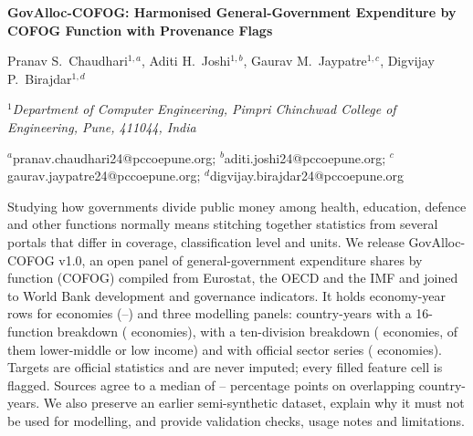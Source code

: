 \documentclass[11pt,a4paper]{article}
\DeclareRobustCommand*{\_}{\textunderscore\hskip0pt\relax}
\begin{document}
\begin{center}
{\LARGE\bfseries GovAlloc-COFOG: Harmonised General-Government Expenditure by COFOG Function with Provenance Flags\par}
\vspace{1.2em}
{\large Pranav S.\ Chaudhari$^{1,a}$, Aditi H.\ Joshi$^{1,b}$, Gaurav M.\ Jaypatre$^{1,c}$, Digvijay P.\ Birajdar$^{1,d}$\par}
\vspace{0.8em}
{\small\itshape $^{1}$Department of Computer Engineering, Pimpri Chinchwad College of Engineering, Pune, 411044, India\par}
\vspace{0.5em}
{\small $^{a}$pranav.chaudhari24@pccoepune.org; $^{b}$aditi.joshi24@pccoepune.org; $^{c}$gaurav.jaypatre24@pccoepune.org; $^{d}$digvijay.birajdar24@pccoepune.org\par}
\end{center}
\vspace{0.6em}
\par\vspace{0.4em}
{\small\noindent Studying how governments divide public money among health, education, defence and other functions normally means stitching together statistics from several portals that differ in coverage, classification level and units. We release GovAlloc-COFOG v1.0, an open panel of general-government expenditure shares by function (COFOG) compiled from Eurostat, the OECD and the IMF and joined to \DNumFeat{} World Bank development and governance indicators. It holds \DMasterRows{} economy-year rows for \DMasterEcon{} economies (\DYearLo--\DYearHi) and three modelling panels: \DRowsSix{} country-years with a 16-function breakdown (\DEconSix{} economies), \DRowsTen{} with a ten-division breakdown (\DEconTen{} economies, \DTenLowMid{} of them lower-middle or low income) and \DRowsWdi{} with official sector series (\DEconWdi{} economies). Targets are official statistics and are never imputed; every filled feature cell is flagged. Sources agree to a median of \DEoMedLo--\DIeMedHi{} percentage points on overlapping country-years. We also preserve an earlier semi-synthetic dataset, explain why it must not be used for modelling, and provide validation checks, usage notes and limitations.\par}
\vspace{0.5em}
\vspace{0.8em}
\end{document}
